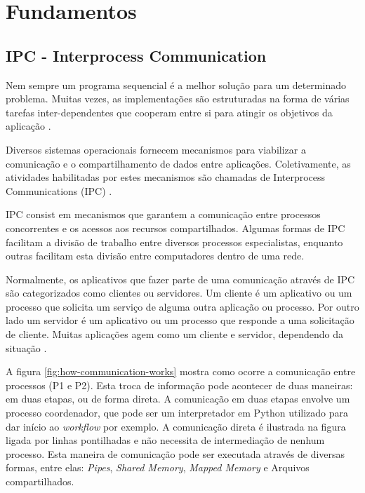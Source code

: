 \chapter[Fundamentos]{Fundamentos}

\section{IPC - Interprocess Communication}\label{sec:ipc}

Nem sempre um programa sequencial é a melhor solução para um determinado problema. Muitas vezes, as implementações são estruturadas na forma de várias tarefas inter-dependentes que cooperam entre si para atingir os objetivos da aplicação \cite{sistemas-op-mazierro}.

Diversos sistemas operacionais fornecem mecanismos para viabilizar a comunicação e o compartilhamento de dados entre aplicações. Coletivamente, as atividades habilitadas por estes mecanismos são chamadas de Interprocess Communications (IPC) \cite{microsoft-ipc}.

IPC consist em mecanismos que garantem a comunicação entre processos concorrentes e os acessos aos recursos compartilhados. Algumas formas de IPC facilitam a divisão de trabalho entre diversos processos especialistas, enquanto outras facilitam esta divisão entre computadores dentro de uma rede.

Normalmente, os aplicativos que fazer parte de uma comunicação através de IPC são categorizados como clientes ou servidores. Um cliente é um aplicativo ou um processo que solicita um serviço de alguma outra aplicação ou processo. Por outro lado um servidor é um aplicativo ou um processo que responde a uma solicitação de cliente. Muitas aplicações agem como um cliente e servidor, dependendo da situação \cite{microsoft-ipc}.

A figura \ref{fig:how-communication-works} mostra como ocorre a comunicação entre processos (P1 e P2). Esta troca de informação pode acontecer de duas maneiras: em duas etapas, ou de forma direta. A comunicação em duas etapas envolve um processo coordenador, que pode ser um interpretador em Python utilizado para dar início ao \textit{workflow} por exemplo. A comunicação direta é ilustrada na figura ligada por linhas pontilhadas e não necessita de intermediação de nenhum processo. Esta maneira de comunicação pode ser executada através de diversas formas, entre elas: \textit{Pipes}, \textit{Shared Memory}, \textit{Mapped Memory} e Arquivos compartilhados.

